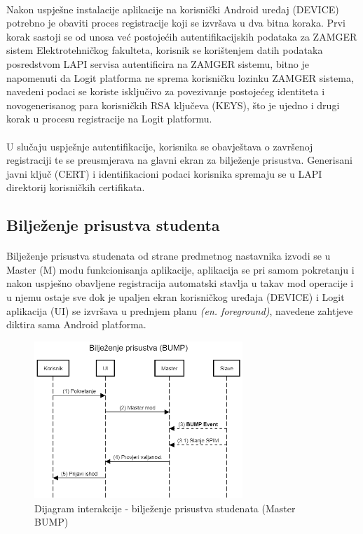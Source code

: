 \paragraph*{}
Nakon uspješne instalacije aplikacije na korisnički Android uređaj (DEVICE) potrebno je obaviti proces registracije koji se izvršava u dva bitna koraka. Prvi korak sastoji se od unosa već postojećih autentifikacijskih podataka za ZAMGER sistem Elektrotehničkog fakulteta, korisnik se korištenjem datih podataka posredstvom LAPI servisa autentificira na ZAMGER sistemu, bitno je napomenuti da Logit platforma ne sprema korisničku lozinku ZAMGER sistema, navedeni podaci se koriste isključivo za povezivanje postojećeg identiteta i novogenerisanog para korisničkih RSA ključeva (KEYS), što je ujedno i drugi korak u procesu registracije na Logit platformu.

\paragraph*{}
U slučaju uspješnje autentifikacije, korisnika se obavještava o završenoj registraciji te se preusmjerava na glavni ekran za bilježenje prisustva. Generisani javni ključ (CERT) i identifikacioni podaci korisnika spremaju se u LAPI direktorij korisničkih certifikata.

\subsection*{Bilježenje prisustva studenta}
\paragraph*{}
Bilježenje prisustva studenata od strane predmetnog nastavnika izvodi se u Master (M) modu funkcionisanja aplikacije, aplikacija se pri samom pokretanju i nakon uspješno obavljene registracija automatski stavlja u takav mod operacije i u njemu ostaje sve dok je upaljen ekran korisničkog uređaja (DEVICE) i Logit aplikacija (UI) se izvršava u prednjem planu \textit{(en. foreground)}, navedene zahtjeve diktira sama Android platforma.

\begin{figure}[H]
    \centering
    \includegraphics[width=0.7\textwidth]{material/dia/02_bump}
    \caption{Dijagram interakcije - bilježenje prisustva studenata (Master BUMP)}
\end{figure}
